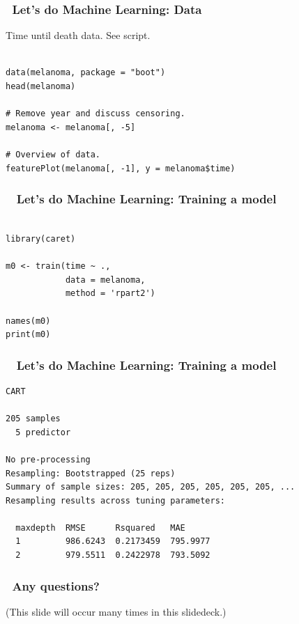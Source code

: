 \documentclass[handout, aspectratio = 169]{beamer}
\begin{document}
\begin{frame}[fragile]
\frametitle{\insertframenumber~Let's do Machine Learning: Data}
Time until death data. See script.
\begin{Verbatim}

data(melanoma, package = "boot")
head(melanoma)

# Remove year and discuss censoring.
melanoma <- melanoma[, -5]

# Overview of data.
featurePlot(melanoma[, -1], y = melanoma$time)

\end{Verbatim}

\end{frame} 



\begin{frame}[fragile]
\frametitle{\insertframenumber~ Let's do Machine Learning: Training a model}
\begin{Verbatim}

library(caret)

m0 <- train(time ~ ., 
            data = melanoma,
            method = 'rpart2')
            
names(m0)
print(m0)

\end{Verbatim}

\end{frame} 








\begin{frame}[fragile]
\frametitle{\insertframenumber~ Let's do Machine Learning: Training a model}
\begin{Verbatim}
CART 

205 samples
  5 predictor

No pre-processing
Resampling: Bootstrapped (25 reps) 
Summary of sample sizes: 205, 205, 205, 205, 205, 205, ... 
Resampling results across tuning parameters:

  maxdepth  RMSE      Rsquared   MAE     
  1         986.6243  0.2173459  795.9977
  2         979.5511  0.2422978  793.5092

\end{Verbatim}

\end{frame} 





\begin{frame}
\frametitle{\insertframenumber~Any questions?}

(This slide will occur many times in this slidedeck.)

\end{frame} 
\end{document}
